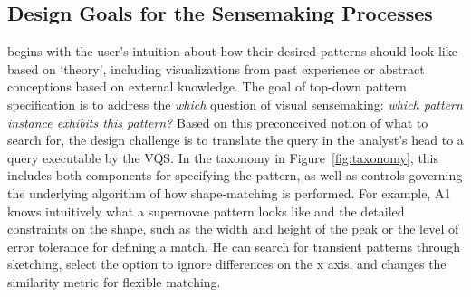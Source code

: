 \subsection{Design Goals for the Sensemaking Processes}
 begins with the user's intuition 
about how their desired patterns should look like based on `theory', including visualizations from past experience or abstract conceptions based on external knowledge. The goal of top-down pattern specification is to address the \textit{which} question of visual sensemaking: \textit{which pattern instance exhibits this pattern?} Based on this preconceived notion of what to search for, the design challenge is to translate the query in the 
analyst's head to a query executable by the VQS. 
In the taxonomy in Figure~\ref{fig:taxonomy}, 
this includes both components for specifying the pattern, 
as well as controls governing the underlying 
algorithm of how shape-matching is performed. 
For example, A1 knows intuitively 
what a supernovae pattern looks like 
and the detailed constraints on the shape, 
such as the width and height of the peak 
or the level of error tolerance for defining a match. 
He can search for transient patterns through sketching, 
select the option to ignore differences 
on the x axis, and changes the similarity metric for flexible matching.  %
